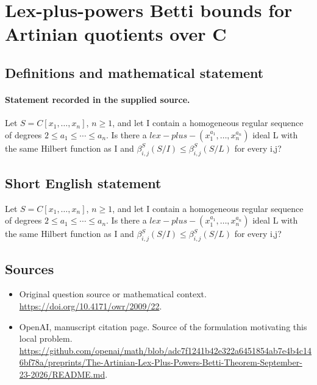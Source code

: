 \documentclass[11pt]{article}
\begin{document}
\section*{Lex-plus-powers Betti bounds for Artinian quotients over C}\label{30006990}
\subsection{Definitions and mathematical statement}
\paragraph{Statement recorded in the supplied source.}
Let $S=C[x_{1},\dots ,x_{n}]$, $n\geq 1$, and let I contain a homogeneous regular sequence of degrees $2\leq a_{1}\leq \cdots \leq a_{n}$. Is there a $lex-plus-(x_{1}^{a_{1}},\dots ,x_{n}^{a_{n}})$ ideal L with the same Hilbert function as I and $\beta ^S_{i,j}(S/I)\leq \beta ^S_{i,j}(S/L)$ for every i,j?
\subsection{Short English statement}
Let $S=C[x_{1},\dots ,x_{n}]$, $n\geq 1$, and let I contain a homogeneous regular sequence of degrees $2\leq a_{1}\leq \cdots \leq a_{n}$. Is there a $lex-plus-(x_{1}^{a_{1}},\dots ,x_{n}^{a_{n}})$ ideal L with the same Hilbert function as I and $\beta ^S_{i,j}(S/I)\leq \beta ^S_{i,j}(S/L)$ for every i,j?
\subsection{Sources}
\begin{itemize}
\item[S1] Original question source or mathematical context.
\url{https://doi.org/10.4171/owr/2009/22}.
\item[S2] OpenAI, manuscript citation page. Source of the formulation motivating this local problem.
\url{https://github.com/openai/math/blob/adc7f1241b42e322a6451854ab7e4b4c146bf78a/preprints/The-Artinian-Lex-Plus-Powers-Betti-Theorem-September-23-2026/README.md}.
\end{itemize}
\end{document}
